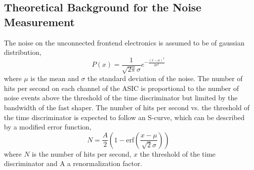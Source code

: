 \subsection{Theoretical Background for the Noise Measurement} \label{sec:noise_theory}
The noise on the unconnected frontend electronics is assumed to be of gaussian distribution,
\begin{equation}
    P(x) = \frac{1}{\sqrt{2\pi}\sigma}e^{-\frac{(x-\mu)^2}{2\sigma^2}}
\end{equation}
where $\mu$ is the mean and $\sigma$ the standard deviation of the noise\autocite{Theorynoise}.
\newline
The number of hits per second on each channel of the ASIC is proportional to the number of noise events above the threshold of the time discriminator but limited by the bandwidth of the fast shaper\autocite{Theorynoise}.
\newline
The number of hits per second vs. the threshold of the time discriminator is expected to follow an S-curve, which can be described by a modified error function,
\begin{equation}
    N = \frac{A}{2} \left( 1 - \text{erf} \left( \frac{x - \mu}{\sqrt{2}\sigma} \right) \right)
\end{equation}
where $N$ is the number of hits per second, $x$ the threshold of the time discriminator and A a renormalization factor\autocite{Theorynoise}.